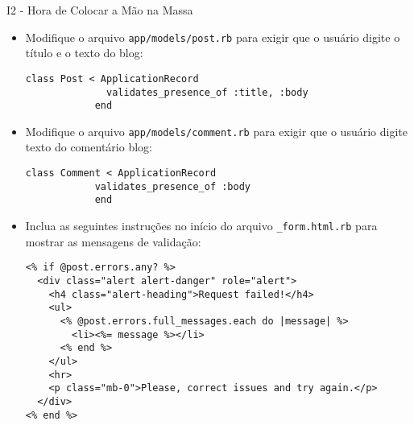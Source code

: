 \begin{frame}{I2 - Hora de Colocar a Mão na Massa}
	\begin{itemize}
			
		\item Modifique o arquivo \verb|app/models/post.rb| para exigir 
			que o usuário digite o título e o texto do blog:
		\begin{lstlisting}[style=RubyInputStyle]
			class Post < ApplicationRecord
			  validates_presence_of :title, :body
			end
		\end{lstlisting}
		
		\item Modifique o arquivo \verb|app/models/comment.rb| para exigir 
		que o usuário digite texto do comentário blog:
		\begin{lstlisting}[style=RubyInputStyle]
			class Comment < ApplicationRecord
		    validates_presence_of :body
			end
		\end{lstlisting}
		
		\item Inclua as seguintes instruções no início do arquivo \verb|_form.html.rb| para
		 mostrar as mensagens de validação:
		\begin{lstlisting}[style=RubyInputStyle, caption=app/views/posts/\_form.html.erb]
<% if @post.errors.any? %>
  <div class="alert alert-danger" role="alert">
    <h4 class="alert-heading">Request failed!</h4>
    <ul>
      <% @post.errors.full_messages.each do |message| %>
        <li><%= message %></li>
      <% end %>
    </ul>
    <hr>
    <p class="mb-0">Please, correct issues and try again.</p>
  </div>
<% end %>

		\end{lstlisting}
		
	\end{itemize}
\end{frame}
